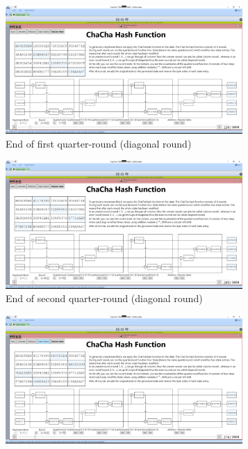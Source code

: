 \begin{figure}
\centering
\begin{subfigure}{0.5\textwidth}
  \centering
  \includegraphics[width=0.99\textwidth]{figures/ct2/chachahash/chachahash-dr1-end.png}
  \caption{End of first quarter-round (diagonal round)}
  \label{fig:chachahash.dr.1}
\end{subfigure}%
\begin{subfigure}{0.5\textwidth}
  \centering
  \includegraphics[width=0.99\textwidth]{figures/ct2/chachahash/chachahash-dr2-end.png}
  \caption{End of second quarter-round (diagonal round)}
  \label{fig:chachahash.dr.2}
\end{subfigure}
\begin{subfigure}{0.5\textwidth}
  \centering
  \includegraphics[width=0.99\textwidth]{figures/ct2/chachahash/chachahash-dr3-end.png}

\end{subfigure}
\end{figure}
